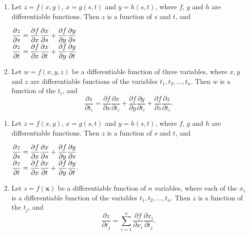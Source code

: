 \ifcalculus
\begin{theorem}\label{thm:multi_chain2}
\begin{enumerate}
	\item Let $z=f(x,y)$, $x=g(s,t)$ and $y=h(s,t)$, where $f$, $g$ and $h$ are differentiable functions. Then $z$ is a function of $s$ and $t$, and
		\begin{multicols}{2}
			$\displaystyle \frac{\partial z}{\partial s} = \frac{\partial f}{\partial x}\frac{\partial x}{\partial s} + \frac{\partial f}{\partial y}\frac{\partial y}{\partial s}$\\
			$\displaystyle \frac{\partial z}{\partial t} = \frac{\partial f}{\partial x}\frac{\partial x}{\partial t} + \frac{\partial f}{\partial y}\frac{\partial y}{\partial t}$
			\end{multicols}

		
		\item		Let $w = f(x,y,z)$ be a differentiable function of three variables, where $x, y$ and $z$ are differentiable functions of the variables $t_1,t_2,\ldots,t_n$. Then $w$ is a function of the $t_i$, and 
		$$\frac{\partial z}{\partial t_i} = \frac{\partial f}{\partial x}\frac{\partial x}{\partial t_i} + \frac{\partial f}{\partial y}\frac{\partial y}{\partial t_i} +  \frac{\partial f}{\partial z}\frac{\partial z}{\partial t_i}.$$
\end{enumerate}
\end{theorem}
\fi


\ifanalysis
\begin{theorem}\label{thm:multi_chain2}

\begin{enumerate}
	\item Let $z=f(x,y)$, $x=g(s,t)$ and $y=h(s,t)$, where $f$, $g$ and $h$ are differentiable functions. Then $z$ is a function of $s$ and $t$, and
		\begin{multicols}{2}
			$\displaystyle \frac{\partial z}{\partial s} = \frac{\partial f}{\partial x}\frac{\partial x}{\partial s} + \frac{\partial f}{\partial y}\frac{\partial y}{\partial s}$\\
			$\displaystyle \frac{\partial z}{\partial t} = \frac{\partial f}{\partial x}\frac{\partial x}{\partial t} + \frac{\partial f}{\partial y}\frac{\partial y}{\partial t}.$
			\end{multicols}
		
		\item		Let $z = f(\mathbf{x})$ be a differentiable function of $n$ variables, where each of the $x_i$ is a differentiable function of the variables $t_1,t_2,\ldots,t_n$. Then $z$ is a function of the $t_j$, and 
		$$\frac{\partial z}{\partial t_j} = \sum\limits_{i=1}^n\frac{\partial f}{\partial x_i}\frac{\partial x_i}{\partial t_j}.$$
\end{enumerate}

\end{theorem}
\fi

